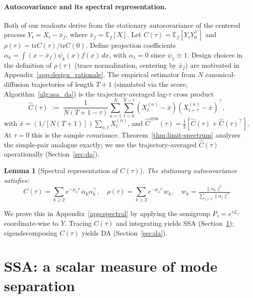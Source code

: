 \documentclass{article}
\newcommand{\E}{\mathbb{E}}
\newcommand{\tr}{\mathrm{tr}}
\newtheorem{lemma}{Lemma}
\begin{document}
\paragraph{Autocovariance and its spectral representation.}
Both of our readouts derive from the stationary autocovariance of the centered process $Y_t = X_t - \bar x_f$, where $\bar x_f = \E_f[X]$. Let $C(\tau) = \E_f[Y_\tau Y_0^\top]$ and $\rho(\tau) = \tr C(\tau) / \tr C(0)$. Define projection coefficients
$\alpha_k = \int (x - \bar x_f)\psi_k(x) f(x)\,dx$, with $\alpha_1 = 0$
since $\psi_1 \equiv 1$. Design choices in the definition of $\rho(\tau)$ (trace normalization, centering by $\bar x_f$) are motivated in
Appendix~\ref{app:design_rationale}. The empirical estimator from
$N$ canonical-diffusion trajectories of length $T+1$ (simulated via
the score; Algorithm~\ref{alg:ssa_da}) is the trajectory-averaged
lag-$\tau$ cross product
\begin{equation}
\hat C(\tau) \;:=\; \frac{1}{N(T+1-\tau)}
\sum_{n=1}^{N}\sum_{t=0}^{T-\tau}
(X_t^{(n)} - \bar x)(X_{t+\tau}^{(n)} - \bar x)^\top,
\label{eq:c_hat_def}
\end{equation}
with $\bar x = (1/[N(T+1)]) \sum_{n,t} X_t^{(n)}$, and
$\hat C^{\mathrm{sym}}(\tau) = \tfrac{1}{2}[\hat C(\tau) + \hat C(\tau)^\top]$.
At $\tau = 0$ this is the sample covariance. Theorem~\ref{thm:limit-spectrum} analyzes the simple-pair analogue exactly; we use the trajectory-averaged $\hat C(\tau)$ operationally (Section~\ref{sec:da}).


\begin{lemma}[Spectral representation of $C(\tau)$]
\label{lem:spectral}
The stationary autocovariance satisfies:
\[
C(\tau) = \sum_{k \geq 2} e^{-\mu_k \tau}\,\alpha_k \alpha_k^\top,
\quad
\rho(\tau) = \sum_{k \geq 2} e^{-\mu_k \tau}\, w_k,
\quad
w_k = \tfrac{\|\alpha_k\|^2}{\sum_{j \geq 2}\|\alpha_j\|^2}
\]
\end{lemma}

We prove this in Appendix~\ref{app:spectral} by applying the semigroup $P_\tau = e^{\tau\mathcal{L}_f}$ coordinate-wise to $Y$. Tracing $C(\tau)$ and integrating yields SSA (Section~\ref{sec:ssa}); eigendecomposing $C(\tau)$ yields DA (Section~\ref{sec:da}).

\section{SSA: a scalar measure of mode separation}
\label{sec:ssa}
\end{document}
